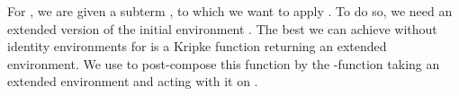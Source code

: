 
For , we are given a subterm , to which we
want to apply .
To do so, we need an extended version of the initial environment
\AgdaBound{$\rho$}.
The best we can achieve without identity environments for \AgdaBound{$\V$} is
a Kripke function returning an extended environment.
We use  to post-compose this function by the
\AgdaSymbol{$\lambda$}-function taking an extended environment and acting with
it on .

